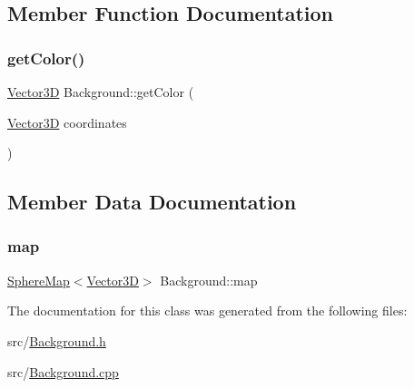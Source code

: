 \subsection{Member Function Documentation}
\mbox{\label{classBackground_a901242466450821f487a1967d94c6506}} 
\subsubsection{\texorpdfstring{getColor()}{getColor()}}
{\footnotesize\ttfamily \mbox{\hyperlink{classVector3D}{Vector3D}} Background\+::get\+Color (\begin{DoxyParamCaption}\item[{\mbox{\hyperlink{classVector3D}{Vector3D}}}]{coordinates }\end{DoxyParamCaption})}



\subsection{Member Data Documentation}
\mbox{\label{classBackground_af0f03647aa08a06ba2a2105832c2097c}} 
\subsubsection{\texorpdfstring{map}{map}}
{\footnotesize\ttfamily \mbox{\hyperlink{classSphereMap}{Sphere\+Map}}$<$\mbox{\hyperlink{classVector3D}{Vector3D}}$>$ Background\+::map\hspace{0.3cm}{\ttfamily [private]}}



The documentation for this class was generated from the following files\+:\begin{DoxyCompactItemize}
\item 
src/\mbox{\hyperlink{Background_8h}{Background.\+h}}\item 
src/\mbox{\hyperlink{Background_8cpp}{Background.\+cpp}}\end{DoxyCompactItemize}
